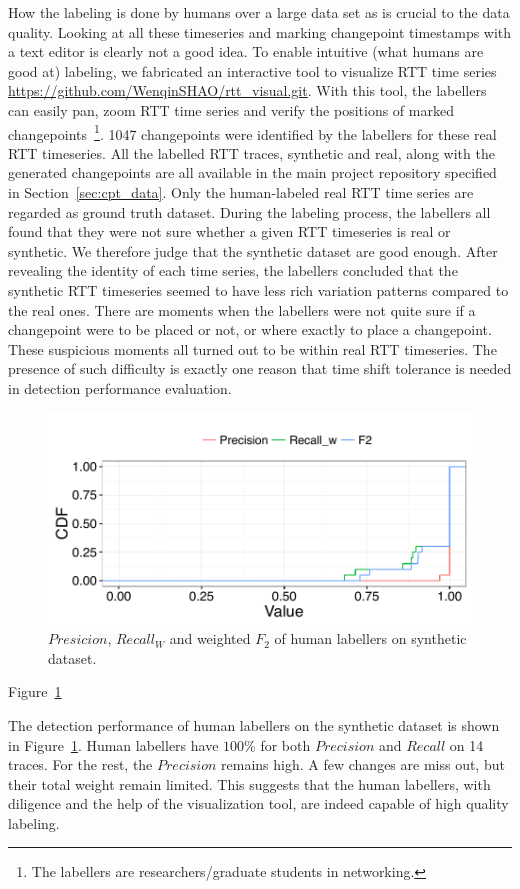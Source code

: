 How the labeling is done by humans over a large data set as is crucial to the data quality.
Looking at all these timeseries and marking changepoint timestamps with a text editor is clearly not a good idea.
To enable intuitive (what humans are good at) labeling, we fabricated an interactive tool to visualize RTT time series \url{https://github.com/WenqinSHAO/rtt_visual.git}.
With this tool, the labellers can easily pan, zoom RTT time series and verify the positions of marked changepoints~\footnote{The labellers are researchers/graduate students in networking.}.
1047 changepoints were identified by the labellers for these real RTT timeseries.
All the labelled RTT traces, synthetic and real, along with the generated changepoints are all available in the main project repository specified in Section~\ref{sec:cpt_data}.
Only the human-labeled real RTT time series are regarded as ground truth dataset.
During the labeling process, the labellers all found that they were not sure whether a given RTT timeseries is real or synthetic.
We therefore judge that the synthetic dataset are good enough.
After revealing the identity of each time series, the labellers concluded that the synthetic RTT timeseries seemed to have less rich variation patterns compared to the real ones.
There are moments when the labellers were not quite sure if a changepoint were to be placed or not, or where exactly to place a changepoint.
These suspicious moments all turned out to be within real RTT timeseries.
The presence of such difficulty is exactly one reason that time shift tolerance is needed in detection performance evaluation.

\begin{figure}[!htb]
\centering
\includegraphics[width=.72\textwidth]{gfx/chap4/antoine_eval.pdf}
\caption{$Presicion$, $Recall_W$ and weighted $F_2$ of human labellers on synthetic dataset.}
\label{fig:antoine_eval}
\end{figure}
Figure~\ref{fig:antoine_eval}

The detection performance of human labellers on the synthetic dataset is shown in Figure~\ref{fig:antoine_eval}. 
Human labellers have $100\%$ for both $Precision$ and $Recall$ on 14 traces.
For the rest, the $Precision$ remains high. A few changes are miss out, but their total weight remain limited.
This suggests that the human labellers, with diligence and the help of the visualization tool, are indeed capable
of high quality labeling.

